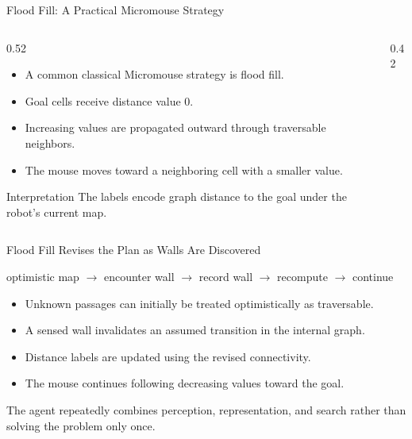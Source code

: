 \documentclass[aspectratio=169,10pt]{beamer}
\begin{document}
\begin{frame}[shrink=20]{Flood Fill: A Practical Micromouse Strategy}
  \begin{columns}[T,onlytextwidth]
    \begin{column}{0.52\textwidth}
      \begin{itemize}
        \item A common classical Micromouse strategy is flood fill.
        \item Goal cells receive distance value $0$.
        \item Increasing values are propagated outward through traversable neighbors.
        \item The mouse moves toward a neighboring cell with a smaller value.
      \end{itemize}

      \begin{block}{Interpretation}
        The labels encode graph distance to the goal under the robot's current map.
      \end{block}
    \end{column}

    \begin{column}{0.42\textwidth}
    \end{column}
  \end{columns}

\end{frame}

\begin{frame}[shrink=20]{Flood Fill Revises the Plan as Walls Are Discovered}
  \begin{center}
    \Large
    optimistic map $\rightarrow$ encounter wall $\rightarrow$ record wall $\rightarrow$ recompute $\rightarrow$ continue
  \end{center}

  \begin{itemize}
    \item Unknown passages can initially be treated optimistically as traversable.
    \item A sensed wall invalidates an assumed transition in the internal graph.
    \item Distance labels are updated using the revised connectivity.
    \item The mouse continues following decreasing values toward the goal.
  \end{itemize}

  \begin{keyidea}
    The agent repeatedly combines perception, representation, and search rather than solving the problem only once.
  \end{keyidea}

\end{frame}
\end{document}
